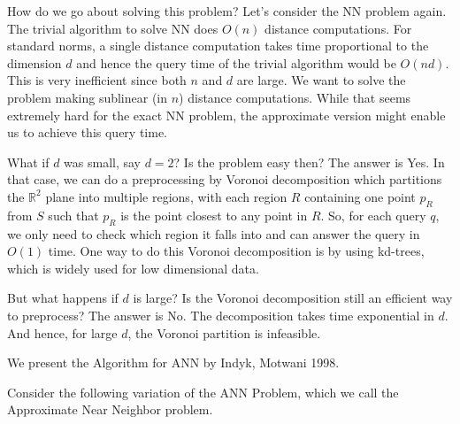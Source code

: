 \documentclass[11pt]{article}
\begin{document}
How do we go about solving this problem? Let's consider the {\sc NN} problem again. The trivial algorithm to solve {\sc NN} does $O(n)$ distance computations. For standard norms, a single distance computation takes time proportional to the dimension $d$ and hence the query time of the trivial algorithm would be $O(nd)$. This is very inefficient since both $n$ and $d$ are large. We want to solve the problem making sublinear (in $n$) distance computations. While that seems extremely hard for the exact {\sc NN} problem, the approximate version might enable us to achieve this query time.  

What if $d$ was small, say $d=2$? Is the problem easy then? The answer is Yes. In that case, we can do a preprocessing by Voronoi decomposition which partitions the $\mathbb{R}^2$ plane into multiple regions, with each region $R$ containing one point $p_R$ from $S$ such that $p_R$ is the point closest to any point in $R$. So, for each query $q$, we only need to check which region it falls into and can answer the query in $O(1)$ time. One way to do this Voronoi decomposition is by using kd-trees, which is widely used for low dimensional data.

But what happens if $d$ is large? Is the Voronoi decomposition still an efficient way to preprocess? The answer is No. The decomposition takes time exponential in $d$. And hence, for large $d$, the Voronoi partition is infeasible.

We present the Algorithm for {\sc ANN} by Indyk, Motwani 1998.

Consider the following variation of the {\sc ANN} Problem, which we call the {\sc Approximate Near Neighbor} problem. \medskip 

\noindent
{}
\medskip
\end{document}
